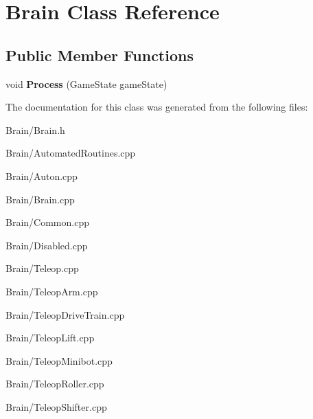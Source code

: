 \hypertarget{class_brain}{
\section{\-Brain \-Class \-Reference}
\label{class_brain}
}
\subsection*{\-Public \-Member \-Functions}
\begin{DoxyCompactItemize}
\item 
\hypertarget{class_brain_a683247df54babd7c6b3b26f49aea027b}{
void {\bfseries \-Process} (\-Game\-State game\-State)}
\label{class_brain_a683247df54babd7c6b3b26f49aea027b}

\end{DoxyCompactItemize}


\-The documentation for this class was generated from the following files\-:\begin{DoxyCompactItemize}
\item 
\-Brain/\-Brain.\-h\item 
\-Brain/\-Automated\-Routines.\-cpp\item 
\-Brain/\-Auton.\-cpp\item 
\-Brain/\-Brain.\-cpp\item 
\-Brain/\-Common.\-cpp\item 
\-Brain/\-Disabled.\-cpp\item 
\-Brain/\-Teleop.\-cpp\item 
\-Brain/\-Teleop\-Arm.\-cpp\item 
\-Brain/\-Teleop\-Drive\-Train.\-cpp\item 
\-Brain/\-Teleop\-Lift.\-cpp\item 
\-Brain/\-Teleop\-Minibot.\-cpp\item 
\-Brain/\-Teleop\-Roller.\-cpp\item 
\-Brain/\-Teleop\-Shifter.\-cpp\end{DoxyCompactItemize}
